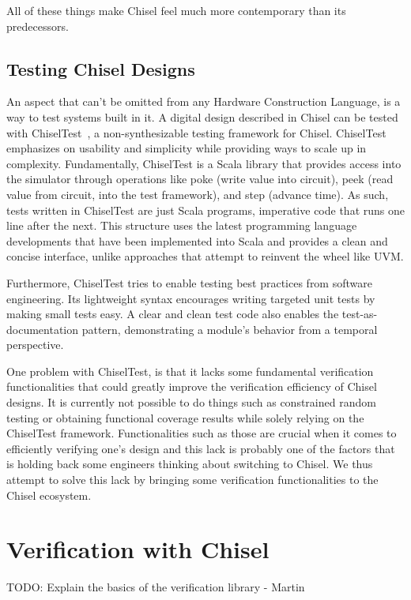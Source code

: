 \documentclass[runningheads]{llncs}
\newcommand{\todo}[1]{{\color{olive} TODO: #1}}
\begin{document}
All of these things make Chisel feel much more contemporary than its predecessors.

\subsection{Testing Chisel Designs}
An aspect that can't be omitted from any Hardware Construction Language, is a way to test systems built in it.
A digital design described in Chisel can be tested with ChiselTest~\cite{chisel:tester2}, a non-synthesizable testing framework for Chisel.
ChiselTest emphasizes on usability and simplicity while providing ways to scale up in complexity.
Fundamentally, ChiselTest is a Scala library that provides access into the simulator through
operations like poke (write value into circuit), peek (read value from circuit, into the test framework), and step (advance time).
As such, tests written in ChiselTest are just Scala programs, imperative code that runs one line after the next.
This structure uses the latest programming language developments that have been implemented into Scala
and provides a clean and concise interface, unlike approaches that attempt to reinvent the wheel like UVM.

Furthermore, ChiselTest tries to enable testing best practices from software engineering.
Its lightweight syntax encourages writing targeted unit tests by making small tests easy.
A clear and clean test code also enables the test-as-documentation pattern,
demonstrating a module's behavior from a temporal perspective.

One problem with ChiselTest, is that it lacks some fundamental verification functionalities that could greatly improve the verification efficiency of Chisel designs. 
It is currently not possible to do things such as constrained random testing or obtaining functional coverage results while solely relying on the ChiselTest framework. 
Functionalities such as those are crucial when it comes to efficiently verifying one's design and this lack is probably one of the factors that is holding back some engineers thinking about switching to Chisel. 
We thus attempt to solve this lack by bringing some verification functionalities to the Chisel ecosystem. 


\section{Verification with Chisel}

\todo{Explain the basics of the verification library - Martin}
\end{document}
